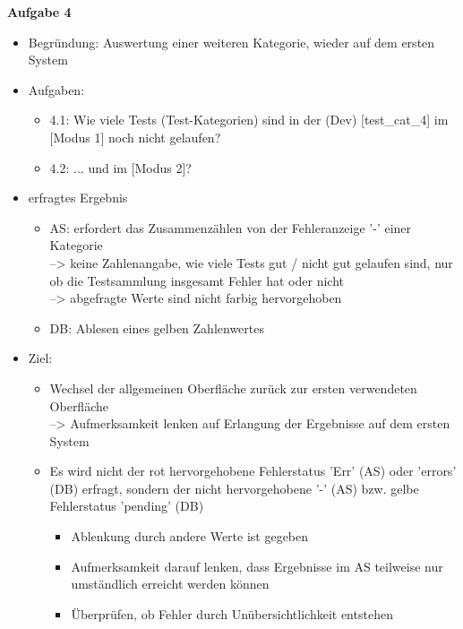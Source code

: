 \newpage
\noindent
\textbf{Aufgabe 4}
\begin{itemize}
    \item Begründung: Auswertung einer weiteren Kategorie, wieder auf dem ersten System
    \item Aufgaben:
    \begin{itemize}
        \item 4.1: Wie viele Tests (Test-Kategorien) sind in der (Dev) [test\_cat\_4] im [Modus 1] noch nicht gelaufen?
        \item 4.2: ... und im [Modus 2]?
    \end{itemize}
    \item erfragtes Ergebnis
    \begin{itemize}
        \item AS: erfordert das Zusammenzählen von der Fehleranzeige '-' einer Kategorie\\
                --> keine Zahlenangabe, wie viele Tests gut / nicht gut gelaufen sind, nur ob die Testsammlung insgesamt Fehler hat oder nicht\\
                --> abgefragte Werte sind nicht farbig hervorgehoben
        \item DB: Ablesen eines gelben Zahlenwertes
    \end{itemize}
    \item Ziel:
    \begin{itemize}
        \item Wechsel der allgemeinen Oberfläche zurück zur ersten verwendeten Oberfläche\\
                --> Aufmerksamkeit lenken auf Erlangung der Ergebnisse auf dem ersten System
        \item Es wird nicht der rot hervorgehobene Fehlerstatus 'Err' (AS) oder 'errors' (DB) erfragt, sondern der nicht hervorgehobene '-' (AS) bzw. gelbe Fehlerstatus 'pending' (DB)
        \begin{itemize}
            \item Ablenkung durch andere Werte ist gegeben
            \item Aufmerksamkeit darauf lenken, dass Ergebnisse im AS teilweise nur umständlich erreicht werden können
            \item Überprüfen, ob Fehler durch Unübersichtlichkeit entstehen
        \end{itemize}
    \end{itemize}
\end{itemize}
